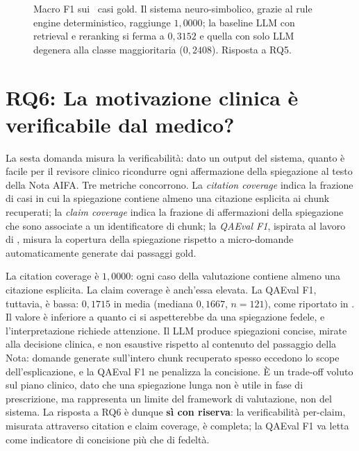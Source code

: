 \begin{figure}[t]
  \centering
  \caption{Macro F1 sui \goldn\ casi gold. Il sistema neuro-simbolico, grazie al rule engine deterministico, raggiunge $1{,}0000$; la baseline LLM con retrieval e reranking si ferma a $0{,}3152$ e quella con solo LLM degenera alla classe maggioritaria ($0{,}2408$). Risposta a RQ5.}
  \label{fig:baseline-bar}
\end{figure}

\section{RQ6: La motivazione clinica è verificabile dal medico?}
\label{sec:rq6}

La sesta domanda misura la verificabilità: dato un output del sistema, quanto è facile per il revisore clinico ricondurre ogni affermazione della spiegazione al testo della Nota AIFA. Tre metriche concorrono. La \emph{citation coverage} indica la frazione di casi in cui la spiegazione contiene almeno una citazione esplicita ai chunk recuperati; la \emph{claim coverage} indica la frazione di affermazioni della spiegazione che sono associate a un identificatore di chunk; la \emph{QAEval F1}, ispirata al lavoro di \citet{deutsch2021qaeval}, misura la copertura della spiegazione rispetto a micro-domande automaticamente generate dai passaggi gold.

La citation coverage è $1{,}0000$: ogni caso della valutazione contiene almeno una citazione esplicita. La claim coverage è anch'essa elevata. La QAEval F1, tuttavia, è bassa: $0{,}1715$ in media (mediana $0{,}1667$, $n=121$), come riportato in . Il valore è inferiore a quanto ci si aspetterebbe da una spiegazione fedele, e l'interpretazione richiede attenzione. Il LLM produce spiegazioni concise, mirate alla decisione clinica, e non esaustive rispetto al contenuto del passaggio della Nota: domande generate sull'intero chunk recuperato spesso eccedono lo scope dell'esplicazione, e la QAEval F1 ne penalizza la concisione. È un trade-off voluto sul piano clinico, dato che una spiegazione lunga non è utile in fase di prescrizione, ma rappresenta un limite del framework di valutazione, non del sistema. La risposta a RQ6 è dunque \textbf{sì con riserva}: la verificabilità per-claim, misurata attraverso citation e claim coverage, è completa; la QAEval F1 va letta come indicatore di concisione più che di fedeltà.

